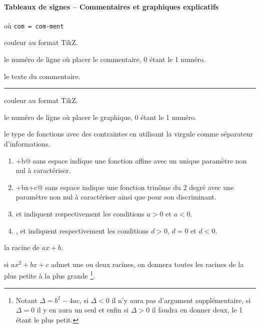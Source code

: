 \documentclass[12pt,a4paper]{article}
\theoremstyle{definition}
\newcommand\separation{
	\medskip
	\hfill\rule{0.5\textwidth}{0.75pt}\hfill
	\medskip
}
\newcommand\mwhyprefix[2]{%
	\texttt{#1 = #1-#2}%
}
\begin{document}
\paragraph{Tableaux de signes -- Commentaires et graphiques explicatifs}

  où \quad \mwhyprefix{com}{ment}


\IDoption{} couleur au format TikZ.


 le numéro de ligne où placer le commentaire, $0$ étant le 1\ier{} numéro.

 le texte du commentaire.


\separation




\IDoption{} couleur au format TikZ.


 le numéro de ligne où placer le graphique, $0$ étant le 1\ier{} numéro.


 le type de fonctions avec des contraintes en utilisant la virgule comme séparateur d'informations.

\begin{enumerate}
	\item \verb@ax+b@ sans espace indique une fonction affine avec un unique paramètre \verb@a@ non nul à caractériser.

	\item {}+bx+c@ sans espace indique une fonction trinôme du 2\ieme{} degré avec une paramètre \verb@a@ non nul à caractériser ainsi que \verb@d@ pour son discriminant.


	\smallskip
	
	\item \verb@ap@ et \verb@an@ indiquent respectivement les conditions $a > 0$ et $a < 0$.

	\item \verb@dp@, \verb@dz@ et \verb@dn@ indiquent respectivement les conditions $d > 0$, $d = 0$ et $d < 0$.
\end{enumerate}


 la racine de $ax + b$.


 si $ax^2 + bx + c$ admet une ou deux racines, on donnera toutes les racines de la plus petite à la plus grande
\footnote{
	Notant $\Delta = b^2 - 4 ac$, si $\Delta < 0$ il n'y aura pas d'argument supplémentaire, si $\Delta = 0$ il y en aura un seul et enfin si $\Delta > 0$ il faudra en donner deux, le 1\ier{} étant le plus petit.
}.
\end{document}
